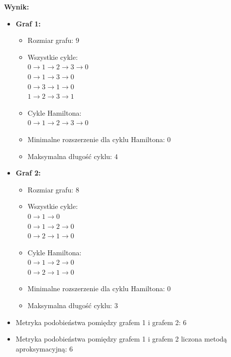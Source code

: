 \noindent \textbf{Wynik:}
\begin{itemize}
    \item \textbf{Graf 1:}
    \begin{itemize}
        \item Rozmiar grafu: \(9\)
        \item Wszystkie cykle:
        		\\ \(0 \to 1 \to 2 \to 3 \to 0\)
    			\\ \(0 \to 1 \to 3 \to 0\)
    			\\ \(0 \to 3 \to 1 \to 0\)
    			\\ \(1 \to 2 \to 3 \to 1\)    			
        \item Cykle Hamiltona:
        		\\ \(0 \to 1 \to 2 \to 3 \to 0\)        
        \item Minimalne rozszerzenie dla cyklu Hamiltona: \(0\)
        \item Maksymalna długość cyklu: \(4\)
    \end{itemize}
    \item \textbf{Graf 2:}
    \begin{itemize}
        \item Rozmiar grafu: \(8\)
        \item Wszystkie cykle:
        		\\ \(0 \to 1 \to 0\)
    			\\ \(0 \to 1 \to 2 \to 0\)
    			\\ \(0 \to 2 \to 1 \to 0\)       
        \item Cykle Hamiltona:
    			\\ \(0 \to 1 \to 2 \to 0\)
    			\\ \(0 \to 2 \to 1 \to 0\)        
        \item Minimalne rozszerzenie dla cyklu Hamiltona: \(0\)
        \item Maksymalna długość cyklu: \(3\)
    \end{itemize}
    \item Metryka podobieństwa pomiędzy grafem 1 i grafem 2: \(6\)
    \item Metryka podobieństwa pomiędzy grafem 1 i grafem 2 liczona metodą aproksymacyjną: \(6\)
\end{itemize}
